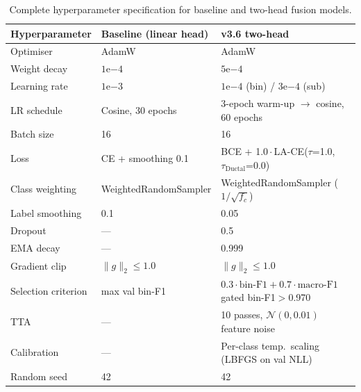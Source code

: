 \begin{table}[t]
\centering
\small
\caption{Complete hyperparameter specification for baseline and two-head fusion models.}
\label{tab:hyperparameters}
\begin{tabular}{lll}
\toprule
\textbf{Hyperparameter} & \textbf{Baseline (linear head)} & \textbf{v3.6 two-head} \\
\midrule
Optimiser            & AdamW                          & AdamW                                \\
Weight decay         & $1\mathrm{e}{-4}$              & $5\mathrm{e}{-4}$                    \\
Learning rate        & $1\mathrm{e}{-3}$              & $1\mathrm{e}{-4}$ (bin) / $3\mathrm{e}{-4}$ (sub) \\
LR schedule          & Cosine, 30 epochs              & 3-epoch warm-up $\to$ cosine, 60 epochs \\
Batch size           & 16                             & 16                                   \\
Loss                 & CE + smoothing 0.1             & BCE + 1.0\,$\cdot$\,LA-CE($\tau$=1.0, $\tau_{\text{Ductal}}$=0.0) \\
Class weighting      & WeightedRandomSampler          & WeightedRandomSampler ($1/\sqrt{f_c}$) \\
Label smoothing      & 0.1                            & 0.05                                 \\
Dropout              & ---                            & 0.5                                  \\
EMA decay            & ---                            & 0.999                                \\
Gradient clip        & $\|g\|_2 \le 1.0$              & $\|g\|_2 \le 1.0$                    \\
Selection criterion  & max val bin-F1                 & $0.3\!\cdot\!\text{bin-F1}+0.7\!\cdot\!\text{macro-F1}$ gated bin-F1$>$0.970 \\
TTA                  & ---                            & 10 passes, $\mathcal{N}(0, 0.01)$ feature noise \\
Calibration          & ---                            & Per-class temp.\ scaling (LBFGS on val NLL) \\
Random seed          & 42                             & 42                                   \\
\bottomrule
\end{tabular}
\end{table}
